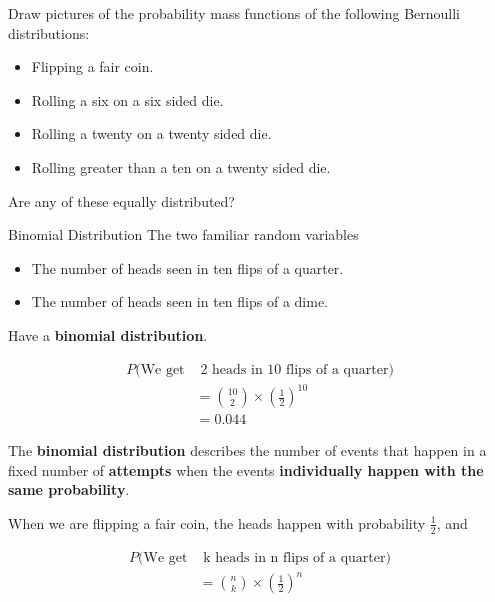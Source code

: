 %
\begin{frame}
Draw pictures of the probability mass functions of the following Bernoulli
distributions:

\begin{itemize}
\item Flipping a fair coin.
\item Rolling a six on a six sided die.
\item Rolling a twenty on a twenty sided die.
\item Rolling greater than a ten on a twenty sided die.
\end{itemize}

Are any of these equally distributed?
\end{frame}
%

%
\begin{frame}{Binomial Distribution}
The two familiar random variables

\begin{itemize}
\item The number of heads seen in ten flips of a quarter.
\item The number of heads seen in ten flips of a dime.
\end{itemize}

Have a \textbf{binomial distribution}.
\end{frame}
%

%
\begin{frame}

\begin{align*}
P(\text{We get} & \text{ 2 heads in 10 flips of a quarter}) \\
%
&= {{10}\choose{2}} \times \left(\frac{1}{2} \right)^{10} \\
%
&= 0.044
\end{align*}

\end{frame}
%

%
\begin{frame}

The \textbf{binomial distribution} describes the number of events that happen in
a fixed number of \textbf{attempts} when the events \textbf{individually happen
with the same probability}.

\end{frame}
%

%
\begin{frame}
When we are flipping a fair coin, the heads happen with probability $\frac{1}{2}$, and

\begin{align*}
P(\text{We get} & \text{ k heads in n flips of a quarter}) \\
%
&= {{n}\choose{k}} \times \left(\frac{1}{2} \right)^n
\end{align*}

\end{frame}
%

